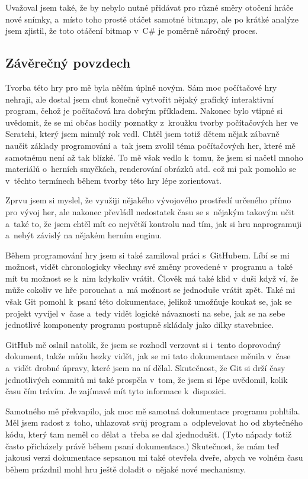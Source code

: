 \documentclass{article}
\begin{document}
Uvažoval jsem také, že by nebylo nutné přidávat pro různé směry otočení hráče nové snímky, a~místo toho prostě otáčet samotné bitmapy, ale po krátké analýze jsem zjistil, že toto otáčení bitmap v~C\# je poměrně náročný proces.

\subsection{Závěrečný povzdech}
Tvorba této hry pro mě byla něčím úplně novým. Sám moc počítačové hry nehraji, ale dostal jsem chuť konečně vytvořit nějaký grafický interaktivní program, čehož je počítačová hra dobrým příkladem. Nakonec bylo vtipné si uvědomit, že se mi občas hodily poznatky z~kroužku tvorby počítačových her ve Scratchi, který jsem minulý rok vedl. Chtěl jsem totiž dětem nějak zábavně naučit základy programování a~tak jsem zvolil téma počítačových her, které mě samotnému není až tak blízké. To mě však vedlo k~tomu, že jsem si načetl mnoho materiálů o~herních smyčkách, renderování obrázků atd. což mi pak pomohlo se v~těchto termínech během tvorby této hry lépe zorientovat. 

Zprvu jsem si myslel, že využiji nějakého vývojového prostředí určeného přímo pro vývoj her, ale nakonec převládl nedostatek času se s~nějakým takovým učit a~také to, že jsem chtěl mít co největší kontrolu nad tím, jak si hru naprogramuji a~nebýt závislý na nějakém herním enginu.

Během programování hry jsem si také zamiloval práci s~GitHubem. Líbí se mi možnost, vidět chronologicky všechny své změny provedené v~programu a~také mít tu možnost se k~nim kdykoliv vrátit. Člověk má také klid v~duši když ví, že může cokoliv ve hře porouchat a~má možnost se jednoduše vrátit zpět. Také mi však Git pomohl k~psaní této dokumentace, jelikož umožňuje koukat se, jak se projekt vyvíjel v~čase a~tedy vidět logické návaznosti na sebe, jak se na sebe jednotlivé komponenty programu postupně skládaly jako dílky stavebnice.

GitHub mě oslnil natolik, že jsem se rozhodl verzovat si i~tento doprovodný dokument, takže můžu hezky vidět, jak se mi tato dokumentace měnila v~čase a~vidět drobné úpravy, které jsem na ní dělal. Skutečnost, že Git si drží časy jednotlivých commitů mi také prospěla v~tom, že jsem si lépe uvědomil, kolik času čím trávím. Je zajímavé mít tyto informace k~dispozici.

Samotného mě překvapilo, jak moc mě samotná dokumentace programu pohltila. Měl jsem radost z~toho, uhlazovat svůj program a~odplevelovat ho od zbytečného kódu, který tam neměl co dělat a~třeba se dal zjednodušit. (Tyto nápady totiž často přicházely právě během psaní dokumentace.) Skutečnost, že mám teď jakousi verzi dokumentace sepsanou mi také otevřela dveře, abych ve volném času během prázdnil mohl hru ještě doladit o~nějaké nové mechanismy. 
\end{document}

